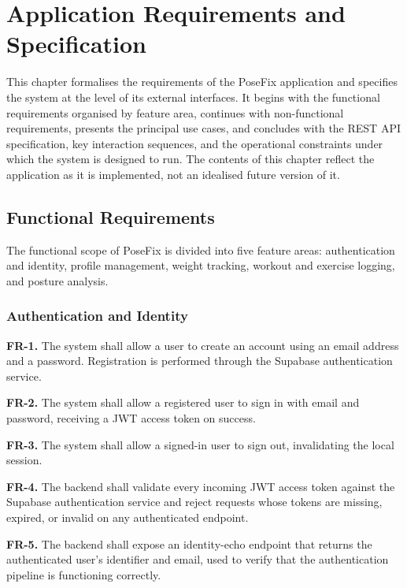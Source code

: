 \chapter{Application Requirements and Specification}
\label{chap:requirements}

This chapter formalises the requirements of the PoseFix application and specifies the system at the level of its external interfaces. It begins with the functional requirements organised by feature area, continues with non-functional requirements, presents the principal use cases, and concludes with the REST API specification, key interaction sequences, and the operational constraints under which the system is designed to run. The contents of this chapter reflect the application as it is implemented, not an idealised future version of it.

\section{Functional Requirements}
\label{sec:functional}

The functional scope of PoseFix is divided into five feature areas: authentication and identity, profile management, weight tracking, workout and exercise logging, and posture analysis.

\subsection{Authentication and Identity}
\label{subsec:fr-auth}

\textbf{FR-1.} The system shall allow a user to create an account using an email address and a password. Registration is performed through the Supabase authentication service.

\textbf{FR-2.} The system shall allow a registered user to sign in with email and password, receiving a JWT access token on success.

\textbf{FR-3.} The system shall allow a signed-in user to sign out, invalidating the local session.

\textbf{FR-4.} The backend shall validate every incoming JWT access token against the Supabase authentication service and reject requests whose tokens are missing, expired, or invalid on any authenticated endpoint.

\textbf{FR-5.} The backend shall expose an identity-echo endpoint that returns the authenticated user's identifier and email, used to verify that the authentication pipeline is functioning correctly.

